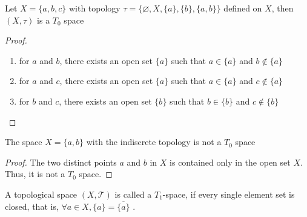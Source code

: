 \documentclass[12pt]{article} %
\begin{document}
\begin{example}
    Let \( X = \{a, b, c\} \) with topology \( \tau = \{\varnothing, X, \{a\}, \{b\}, \{a, b\}\} \) defined on \( X \), 
then \( (X, \tau) \) is a \( T_0 \) space
\end{example}

\begin{proof} ~\\
\begin{enumerate}
    \item for \( a \) and \( b \), there exists an open set \( \{a\} \) such that \( a \in \{a\} \) and \( b \notin \{a\} \)
    \item for \( a \) and \( c \), there exists an open set \( \{a\} \) such that \( a \in \{a\} \) and \( c \notin \{a\} \)
    \item for \( b \) and \( c \), there exists an open set \( \{b\} \) such that \( b \in \{b\} \) and \( c \notin \{b\} \)
\end{enumerate}
\end{proof}

\begin{example}
    The space $X=\{a,b\}$ with the indiscrete topology is not a $T_0$ space
\end{example}

   \begin{proof}
        The two distinct points $a$ and $b$  in $X$ is contained only in the open set $X$. Thus, it is not a $T_0$ space.
    \end{proof}

\begin{definition}\parencite{milewski1994topology} A topological space $(X,\mathcal{T})$ is called a \(T_1\)-space, if every single element set is closed, that is, $\forall a\in X, \{a\}=\overline{\{a\}}$ .
\end{definition}
\end{document}
